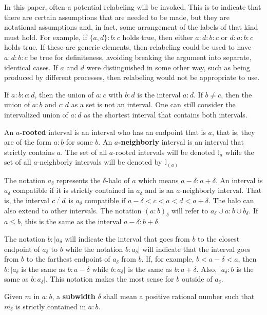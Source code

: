 \documentclass[12pt]{article}
\begin{document}
In this paper, often a potential relabeling will be invoked. This is to indicate that there are certain assumptions that are needed to be made, but they are notational assumptions and, in fact, some arrangement of the labels of that kind must hold. For example, if $\{a,d\}:b:c$ holds true, then either $a:d:b:c$ or $d:a:b:c$ holds true. If these are generic elements, then relabeling could be used to have $a:d:b:c$  be  true for definiteness, avoiding breaking the argument into separate, identical cases. If $a$ and $d$ were distinguished in some other way, such as being produced by different processes, then relabeling would not be appropriate to use. 

If $a:b:c:d$, then the union of $a:c$ with $b:d$ is the interval $a:d$. If $b \neq c$, then the union of $a:b$ and $c:d$ as a set is not an interval. One can still consider the intervalized union of $a:d$ as the shortest interval that contains both intervals. 

An \textbf{$a$-rooted} interval is an interval who has an endpoint that is $a$, that is, they are of the form $a:b$ for some $b$. An  \textbf{$a$-neighborly} interval is an interval that strictly contains $a$. The set of all $a$-rooted intervals will be denoted $\mathbb{I}_a$ while the set of all $a$-neighborly intervals will be denoted by $\mathbb{I}_{(a)}$

The notation $a_\delta$ represents the $\delta$-halo of $a$ which means $a -\delta : a+ \delta$. An interval is $a_\delta$ compatible if it is strictly contained in $a_\delta$ and is an $a$-neighborly interval. That is, the interval $c\lte d$ is $a_\delta$ compatible if $a- \delta < c < a < d < a+ \delta$. The halo can also extend to other intervals. The notation $(a:b)_\delta$ will refer to $a_\delta \cup a:b \cup b_\delta$. If $a \leq b$, this is the same as the interval $a-\delta:b+\delta$. 

The notation $b : |a_\delta$ will indicate the interval that goes from $b$ to the closest endpoint of $a_\delta$ to $b$ while the notation $b:a_{\delta}|$ will indicate that the interval goes from $b$ to the farthest endpoint of $a_\delta$ from $b$. If, for example, $b < a-\delta < a$, then $b:|a_\delta$ is the same as $b:a-\delta$ while $b:a_{\delta}|$ is the same as $b:a+\delta$. Also, $|a_\delta : b$ is the same as $b:a_\delta |$. This notation makes the most sense for $b$ outside of $a_\delta$. 

Given $m$ in $a:b$, a \textbf{subwidth} $\delta$ shall mean a positive rational number such that $m_\delta$ is strictly contained in $a:b$.
\end{document}
